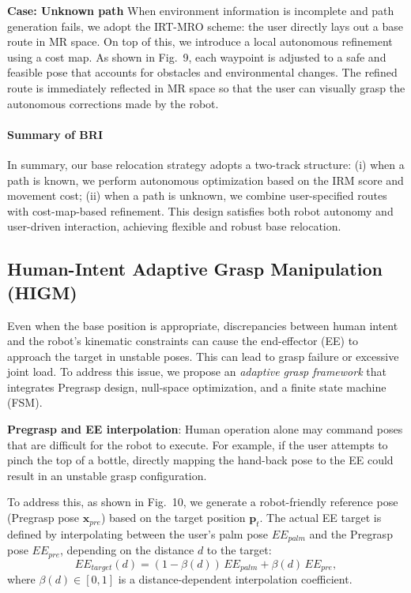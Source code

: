\documentclass[../../main.tex]{subfiles} %
\begin{document}
\medskip
\textbf{Case: Unknown path}  
When environment information is incomplete and path generation fails, we adopt the IRT-MRO \cite{ref5} scheme:  
the user directly lays out a base route in MR space.  
On top of this, we introduce a local autonomous refinement using a cost map.  
As shown in Fig.~9, each waypoint is adjusted to a safe and feasible pose that accounts 
for obstacles and environmental changes.  
The refined route is immediately reflected in MR space so that the user can visually 
grasp the autonomous corrections made by the robot.

\paragraph{Summary of BRI}  
In summary, our base relocation strategy adopts a two-track structure:  
(i) when a path is known, we perform autonomous optimization based on the IRM score and movement cost;  
(ii) when a path is unknown, we combine user-specified routes with cost-map-based refinement.  
This design satisfies both robot autonomy and user-driven interaction, achieving flexible and robust base relocation.



\subsection{Human-Intent Adaptive Grasp Manipulation (HIGM)}

Even when the base position is appropriate, discrepancies between human intent and the robot’s 
kinematic constraints can cause the end-effector (EE) to approach the target in unstable poses.  
This can lead to grasp failure or excessive joint load.  
To address this issue, we propose an \textit{adaptive grasp framework} that integrates Pregrasp design, 
null-space optimization, and a finite state machine (FSM).

\medskip
\textbf{Pregrasp and EE interpolation}:  
Human operation alone may command poses that are difficult for the robot to execute.  
For example, if the user attempts to pinch the top of a bottle, 
directly mapping the hand-back pose to the EE could result in an unstable grasp configuration.

To address this, as shown in Fig.~10, we generate a robot-friendly 
reference pose (Pregrasp pose $\mathbf{x}_{pre}$) based on the target position $\mathbf{p}_t$.  
The actual EE target is defined by interpolating between the user’s palm pose $EE_{palm}$ and 
the Pregrasp pose $EE_{pre}$, depending on the distance $d$ to the target:
\begin{equation}
EE_{target}(d) = (1-\beta(d))\,EE_{palm} + \beta(d)\,EE_{pre},
\end{equation}
where $\beta(d)\in[0,1]$ is a distance-dependent interpolation coefficient.
\end{document}
